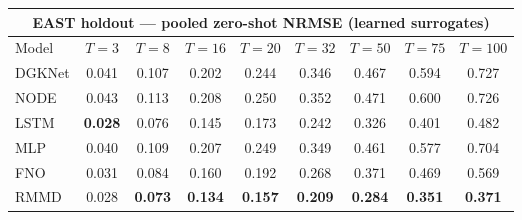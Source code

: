 \begin{tabular}{lcccccccc}
\toprule
\multicolumn{9}{c}{EAST holdout --- pooled zero-shot NRMSE (learned surrogates)} \\
\midrule
Model & $T{=}3$ & $T{=}8$ & $T{=}16$ & $T{=}20$ & $T{=}32$ & $T{=}50$ & $T{=}75$ & $T{=}100$ \\
\midrule
DGKNet & 0.041 & 0.107 & 0.202 & 0.244 & 0.346 & 0.467 & 0.594 & 0.727 \\
NODE & 0.043 & 0.113 & 0.208 & 0.250 & 0.352 & 0.471 & 0.600 & 0.726 \\
LSTM & \textbf{0.028} & 0.076 & 0.145 & 0.173 & 0.242 & 0.326 & 0.401 & 0.482 \\
MLP & 0.040 & 0.109 & 0.207 & 0.249 & 0.349 & 0.461 & 0.577 & 0.704 \\
FNO & 0.031 & 0.084 & 0.160 & 0.192 & 0.268 & 0.371 & 0.469 & 0.569 \\
RMMD & 0.028 & \textbf{0.073} & \textbf{0.134} & \textbf{0.157} & \textbf{0.209} & \textbf{0.284} & \textbf{0.351} & \textbf{0.371} \\
\bottomrule
\end{tabular}
